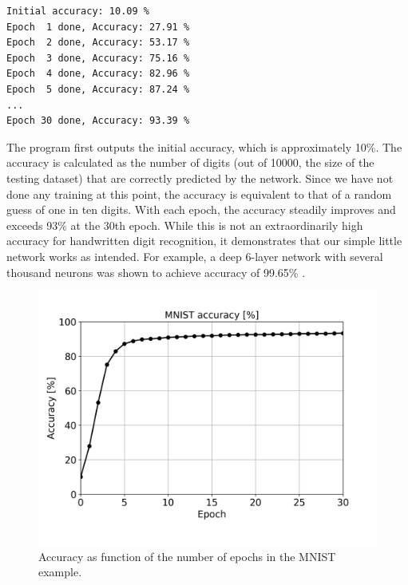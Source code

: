 \documentclass[sigplan, review=false, screen=true, balance=true]{acmart}
\begin{document}
\begin{minipage}{\linewidth}
\begin{lstlisting}[caption={Output from the MNIST training example program. Some lines omitted for brevity.}, captionpos=b]
Initial accuracy: 10.09 %
Epoch  1 done, Accuracy: 27.91 %
Epoch  2 done, Accuracy: 53.17 %
Epoch  3 done, Accuracy: 75.16 %
Epoch  4 done, Accuracy: 82.96 %
Epoch  5 done, Accuracy: 87.24 %
...
Epoch 30 done, Accuracy: 93.39 %
\end{lstlisting}
\end{minipage}

The program first outputs the initial accuracy, which is approximately 10\%.
The accuracy is calculated as the number of digits (out of 10000, the size
of the testing dataset) that are correctly predicted by the network.
Since we have not done any training at this point, the accuracy is equivalent
to that of a random guess of one in ten digits. With each epoch, the accuracy
steadily improves and exceeds 93\% at the 30th epoch. While this is not an
extraordinarily high accuracy for handwritten digit recognition, it demonstrates
that our simple little network works as intended. For example, a deep 6-layer
network with several thousand neurons was shown to achieve accuracy of
99.65\% \citep{ciresan10}.

\begin{figure}[H]
  \centering
  \includegraphics[width=\columnwidth]{../figures/mnist_accuracy.png}
  \caption{Accuracy as function of the number of epochs in the MNIST example.}
  \label{fig_mnist_accuracy}
\end{figure}
\end{document}
